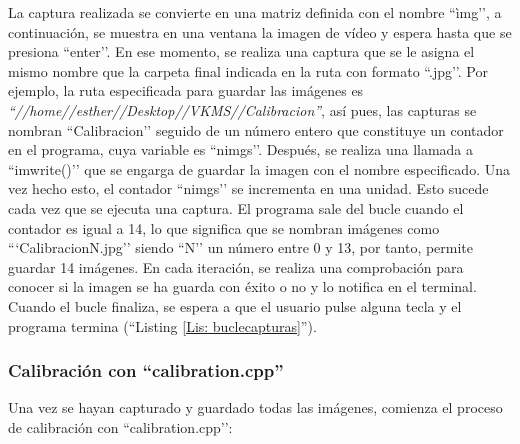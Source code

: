 \begin{itemize}
La captura realizada se convierte en una matriz definida con el nombre ``ìmg’’, a continuación, se muestra en una ventana la imagen de vídeo y espera hasta que se presiona ``enter’’. En ese momento, se realiza una captura que se le asigna el mismo nombre que la carpeta final indicada en la ruta con formato ``.jpg’’. Por ejemplo, la ruta especificada para guardar las imágenes es {\itshape ``//home//esther//Desktop//VKMS//Calibracion''}, así pues, las capturas se nombran ``Calibracion’’ seguido de un número entero que constituye un contador en el programa, cuya variable es ``nimgs’’. Después, se realiza una llamada a ``imwrite()’’ que se engarga de guardar la imagen con el nombre especificado. Una vez hecho esto, el contador ``nimgs’’ se incrementa en una unidad. Esto sucede cada vez que se ejecuta una captura. El programa sale del bucle cuando el contador es igual a 14, lo que significa que se nombran imágenes como ```CalibracionN.jpg’’ siendo ``N’’ un número entre 0 y 13, por tanto, permite guardar 14 imágenes. En cada iteración, se realiza una comprobación para conocer si la imagen se ha guarda con éxito o no y lo notifica en el terminal. Cuando el bucle finaliza, se espera a que el usuario pulse alguna tecla y el programa termina (``Listing \ref{Lis: buclecapturas}'').
    
\end{itemize}


\subsubsection{Calibración con ``calibration.cpp''}\label{s3_2_2_2}

Una vez se hayan capturado y guardado todas las imágenes, comienza el proceso de calibración con ``calibration.cpp’’:

